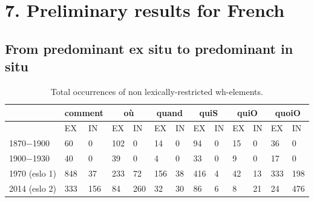 \documentclass[fleqn,10pt]{wlscirep}
\begin{document}
\section*{7. Preliminary results for French}

\subsection*{From predominant ex situ to predominant in situ}

\begin{table}[H]
    \centering
    \small
    \begin{adjustbox}{width=\textwidth}
        \begin{tabular}{l|ll|ll|ll|ll|ll|ll}
        {} & \multicolumn{2}{c}{comment}  & \multicolumn{2}{c}{où} & \multicolumn{2}{c}{quand}& \multicolumn{2}{c}{quiS} & \multicolumn{2}{c}{quiO}& \multicolumn{2}{c}{quoiO}\\
        \hline
        {} & EX & IN & EX & IN & EX & IN & EX & IN & EX & IN & EX & IN\\
        1870$-$1900 & 60 & 0 & 102 & 0 & 14 & 0 & 94 & 0 & 15 & 0 & 36 & 0\\
        1900$-$1930 & 40 & 0 & 39 & 0 & 4 & 0 & 33 & 0 & 9 & 0 & 17 & 0\\
        1970 (eslo 1) & 848 & 37 & 233 & 72 & 156 & 38 & 416 & 4 & 42 & 13 & 333 & 198\\
        2014 (eslo 2) & 333 & 156 & 84 & 260 & 32 & 30 & 86 & 6 & 8 & 21 & 24 & 476 \\
        \hline
        \end{tabular}
    \end{adjustbox}
\caption{\label{tab:samp3}Total occurrences of non lexically-restricted wh-elements.}
\end{table}
\end{document}
